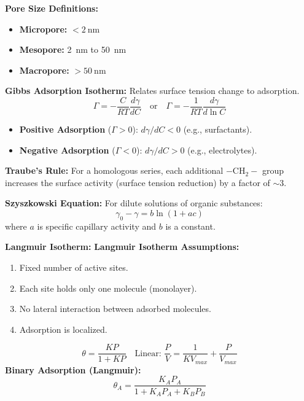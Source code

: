 \textbf{Pore Size Definitions:}
\begin{itemize}
    \item \textbf{Micropore:} $< \SI{2}{\nm}$
    \item \textbf{Mesopore:} \SI{2}{\nm} to \SI{50}{\nm}
    \item \textbf{Macropore:} $> \SI{50}{\nm}$
\end{itemize}

\textbf{Gibbs Adsorption Isotherm:}
Relates surface tension change to adsorption.
\begin{equation}
    \Gamma = -\frac{C}{RT} \frac{d\gamma}{dC} \quad \text{or} \quad \Gamma = -\frac{1}{RT} \frac{d\gamma}{d \ln C}
\end{equation}
\begin{itemize}
    \item \textbf{Positive Adsorption} ($\Gamma > 0$): $d\gamma/dC < 0$ (e.g., surfactants).
    \item \textbf{Negative Adsorption} ($\Gamma < 0$): $d\gamma/dC > 0$ (e.g., electrolytes).
\end{itemize}
\textbf{Traube's Rule:} For a homologous series, each additional $-\text{CH}_2-$ group increases the surface activity (surface tension reduction) by a factor of $\sim 3$.

\textbf{Szyszkowski Equation:}
For dilute solutions of organic substances:
\begin{equation}
    \gamma_0 - \gamma = b \ln(1 + ac)
\end{equation}
where $a$ is specific capillary activity and $b$ is a constant.

\textbf{Langmuir Isotherm:}
\textbf{Langmuir Isotherm Assumptions:}
\begin{enumerate}
    \item Fixed number of active sites.
    \item Each site holds only one molecule (monolayer).
    \item No lateral interaction between adsorbed molecules.
    \item Adsorption is localized.
\end{enumerate}
\begin{equation}
    \theta = \frac{KP}{1+KP} \quad \text{Linear: } \frac{P}{V} = \frac{1}{K V_{max}} + \frac{P}{V_{max}}
\end{equation}
\textbf{Binary Adsorption (Langmuir):}
\begin{equation}
    \theta_A = \frac{K_A P_A}{1 + K_A P_A + K_B P_B}
\end{equation}

